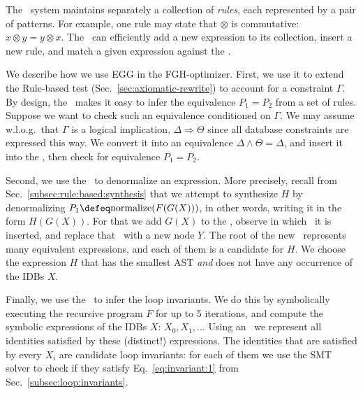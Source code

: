 The \eqsat\ system maintains separately a collection of {\em rules},
each represented by a pair of patterns.  For example, one rule may
state that $\otimes$ is commutative: $x \otimes y = y \otimes x$.  The
\egraph\ can efficiently add a new expression to its collection,
insert a new rule, and match a given expression against the \egraph.

We describe how we use EGG in the FGH-optimizer.  First, we use it to
extend the Rule-based test (Sec.~\ref{sec:axiomatic-rewrite}) to
account for a constraint $\Gamma$.  By design, the \egraph\ makes it
easy to infer the equivalence $P_1 = P_2$ from a set of rules.
Suppose we want to check such an equivalence conditioned on $\Gamma$.
We may assume w.l.o.g.\ that $\Gamma$ is a logical implication,
$\Delta \Rightarrow \Theta$ since all database constraints are
expressed this way.  We convert it into an equivalence
$\Delta \wedge \Theta = \Delta$, and insert it into the \egraph, then
check for equivalence $P_1 = P_2$.

Second, we use the \egraph\ to denormalize an expression.  More
precisely, recall from Sec.~\ref{subsec:rule:based:synthesis} that we
attempt to synthesize $H$ by denormalizing
$P_1 \defeq \text{normalize}(F(G(X)))$, in other words, writing it in
the form $H(G(X))$.  For that we add $G(X)$ to the \egraph, observe in
which \eclass\ it is inserted, and replace that \eclass\ with a new
node $Y$.  The root of the new \egraph\ represents many equivalent
expressions, and each of them is a candidate for $H$.  We choose the
expression $H$ that has the smallest AST {\em and} does not have any
occurrence of the IDBs $X$.

Finally, we use the \egraph\ to infer the loop invariants.  We do this
by symbolically executing the recursive program $F$ for up to 5
iterations, and compute the symbolic expressions of the IDBs $X$:
$X_0, X_1, \ldots$  Using an \egraph\ we represent all identities
satisfied by these (distinct!) expressions.  The identities that are
satisfied by every $X_i$ are candidate loop invariants: for each of
them we use the SMT solver to check if they satisfy
Eq.~\eqref{eq:invariant:1} from 
Sec.~\ref{subsec:loop:invariants}.


